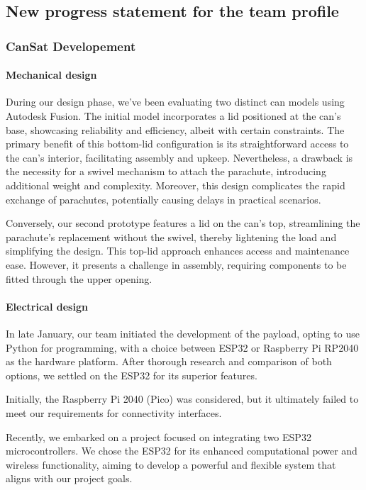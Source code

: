 \subsection{New progress statement for the team profile}

\subsubsection*{CanSat Developement}

\paragraph*{Mechanical design}
During our design phase, we've been evaluating two distinct can models using Autodesk Fusion. The initial model incorporates a lid positioned at the can's base, showcasing reliability and efficiency, albeit with certain constraints. The primary benefit of this bottom-lid configuration is its straightforward access to the can's interior, facilitating assembly and upkeep. Nevertheless, a drawback is the necessity for a swivel mechanism to attach the parachute, introducing additional weight and complexity. Moreover, this design complicates the rapid exchange of parachutes, potentially causing delays in practical scenarios.

Conversely, our second prototype features a lid on the can's top, streamlining the parachute's replacement without the swivel, thereby lightening the load and simplifying the design. This top-lid approach enhances access and maintenance ease. However, it presents a challenge in assembly, requiring components to be fitted through the upper opening.

\paragraph*{Electrical design}
In late January, our team initiated the development of the payload, opting to use Python for programming, with a choice between ESP32 or Raspberry Pi RP2040 as the hardware platform. After thorough research and comparison of both options, we settled on the ESP32 for its superior features.

Initially, the Raspberry Pi 2040 (Pico) was considered, but it ultimately failed to meet our requirements for connectivity interfaces.

Recently, we embarked on a project focused on integrating two ESP32 microcontrollers. We chose the ESP32 for its enhanced computational power and wireless functionality, aiming to develop a powerful and flexible system that aligns with our project goals.

